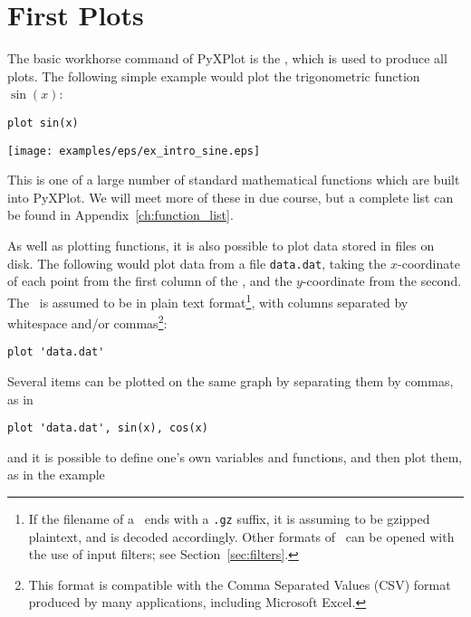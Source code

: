 \section{First Plots}
\label{sec:first_plots}

The basic workhorse command of PyXPlot is the , which is used to
produce all plots. The following simple example would plot the trigonometric
function $\sin(x)$:

\begin{verbatim}
plot sin(x)
\end{verbatim}

\begin{center}
\texttt{[image: examples/eps/ex\_intro\_sine.eps]}
\end{center}

\noindent This is one of a large number of standard mathematical functions
which are built into PyXPlot. We will meet more of these in due course, but a
complete list can be found in Appendix~\ref{ch:function_list}.

As well as plotting functions, it is also possible to plot data stored in files
on disk. The following would plot data from a file {\tt data.dat}, taking the
$x$-coordinate of each point from the first column of the \datafile, and the
$y$-coordinate from the second.  The \datafile\ is assumed to be in plain text
format\footnote{If the filename of a \datafile\ ends with a {\tt .gz} suffix,
it is assuming to be gzipped plaintext, and is decoded accordingly. Other
formats of \datafile\ can be opened with the use of input filters; see
Section~\ref{sec:filters}.}, with columns separated by whitespace and/or
commas\footnote{This format is compatible with the Comma Separated Values (CSV)
format produced by many applications, including Microsoft Excel.}:

\begin{verbatim}
plot 'data.dat'
\end{verbatim}

Several items can be plotted on the same graph by separating them by commas, as
in

\begin{verbatim}
plot 'data.dat', sin(x), cos(x)
\end{verbatim}

\noindent and it is possible to define one's own variables and functions,
and then plot them, as in the example

